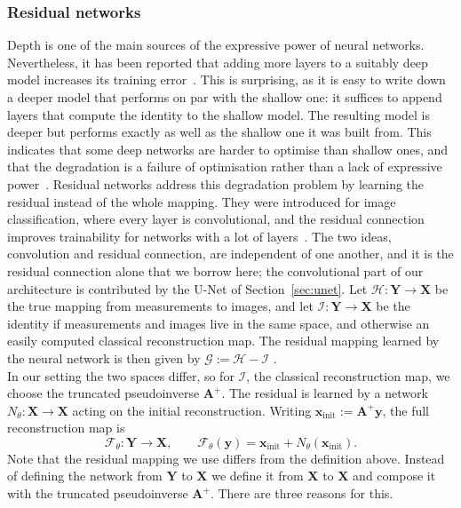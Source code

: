 \documentclass{article}
\numberwithin{equation}{section}
\begin{document}
\subsubsection{Residual networks}
Depth is one of the main sources of the expressive power of neural networks. Nevertheless,
it has been reported that adding more layers to a suitably deep model increases its training error~\parencite{res}.
This is surprising, as it is easy to write down a deeper model that performs on par with the shallow one:
it suffices to append layers that compute the identity to the shallow model.
The resulting model is deeper but performs exactly as well as the shallow one it was built from.
This indicates that some deep networks are harder to optimise than shallow ones, and that the degradation is a
failure of optimisation rather than a lack of expressive power~\parencite{res-org}.
Residual networks address this degradation problem by learning the residual instead of the whole mapping. They were
introduced for image classification, where every layer is convolutional, and the residual connection improves trainability for networks with a lot of layers~\parencite{res-org}. The two ideas, convolution
and residual connection, are independent of one another, and it is the residual connection alone that we borrow here;
the convolutional part of our architecture is contributed by the U-Net of Section~\ref{sec:unet}.
Let $\mathcal{H}:\mathbf{Y}\to\mathbf{X}$ be the true mapping from measurements to images, and let $\mathcal{I}:\mathbf{Y}\to\mathbf{X}$ be the identity
if measurements and images live in the same space, and otherwise an easily computed classical reconstruction map.
The residual mapping learned by the neural network is then given by $\mathcal{G}:= \mathcal{H} - \mathcal{I}$ \parencite{res-org}.\\
In our setting the two spaces differ, so for $\mathcal{I}$, the classical reconstruction
map, we choose the truncated pseudoinverse $\mathbf{A}^+$. The residual is learned
by a network $N_\theta:\mathbf{X}\to\mathbf{X}$ acting on the initial reconstruction. Writing
$\mathbf{x}_\text{init}:=\mathbf{A}^+\mathbf{y}$, the full reconstruction map is
\[\mathcal{F}_\theta:\mathbf{Y}\to\mathbf{X},\qquad
  \mathcal{F}_\theta(\mathbf{y}) = \mathbf{x}_\text{init} + N_\theta(\mathbf{x}_\text{init}).\]
Note that the residual mapping we use differs from the definition above.
Instead of defining the network from $\mathbf{Y}$ to $\mathbf{X}$ we define it from $\mathbf{X}$ to $\mathbf{X}$ and
compose it with the truncated pseudoinverse $\mathbf{A}^{+}$. There are three reasons for this.
\end{document}
